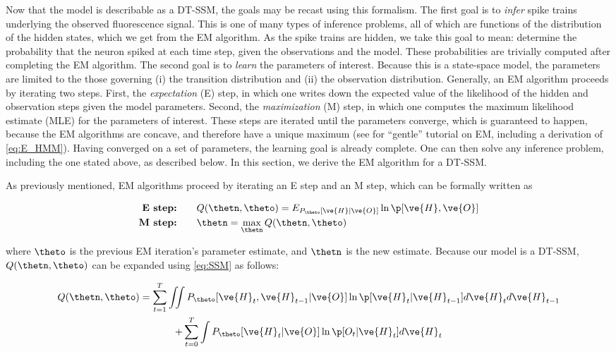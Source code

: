 Now that the model is describable as a DT-SSM, the goals may be recast using this formalism.   The first goal is to \emph{infer} spike trains underlying the observed fluorescence signal. This is one of many types of inference problems, all of which are functions of the distribution of the hidden states, which we get from the EM algorithm.  As the spike trains are hidden, we take this goal to mean: determine the probability that the neuron spiked at each time step, given the observations and the model.  These probabilities are trivially computed after completing the EM algorithm.  The second goal is to \emph{learn} the parameters of interest.  Because this is a state-space model, the parameters are limited to the those governing (i) the transition distribution and (ii) the observation distribution.  Generally, an EM algorithm proceeds by iterating two steps.  First, the \emph{expectation} (E) step, in which one writes down the expected value of the likelihood of the hidden and observation steps given the model parameters.  Second, the \emph{maximization} (M) step, in which one computes the maximum likelihood estimate (MLE) for the parameters of interest.  These steps are iterated until the parameters converge, which is guaranteed to happen, because the EM algorithms are concave, and therefore have a unique maximum (see \cite{GentleEM} for ``gentle'' tutorial on EM, including a derivation of \eqref{eq:E_HMM}).  Having converged on a set of parameters, the learning goal is already complete.  One can then solve any inference problem, including the one stated above, as described below.  In this section, we derive the EM algorithm for a DT-SSM.

As previously mentioned, EM algorithms proceed by iterating an E step and an M step, which can be formally written as

\begin{align*}
\textbf{E step:} &\qquad Q(\thetn,\theto) = E_{P_{\theto}[\ve{H} | \ve{O}]} \ln \p [\ve{H}, \ve{O}]\\
\textbf{M step:} &\qquad \thetn = \max_{\thetn} Q(\thetn,\theto)
\end{align*}

\noindent where $\theto$ is the previous EM iteration's parameter estimate, and $\thetn$ is the new estimate. Because our model is a DT-SSM, $Q(\thetn,\theto)$ can be expanded using \eqref{eq:SSM} as follows:

\begin{multline} \label{eq:E_HMM}
Q(\thetn,\theto) = \sum_{t=1}^T \iint
 P_{\theto} [\ve{H}_t,\ve{H}_{t-1} | \ve{O}]  \ln \p
[\ve{H}_t |  \ve{H}_{t-1}] d\ve{H}_t d\ve{H}_{t-1} \\
+ \sum_{t=0}^T \int P_{\theto} [\ve{H}_t |  \ve{O}] \ln
\p [O_t |  \ve{H}_t] d\ve{H}_t
\end{multline}

